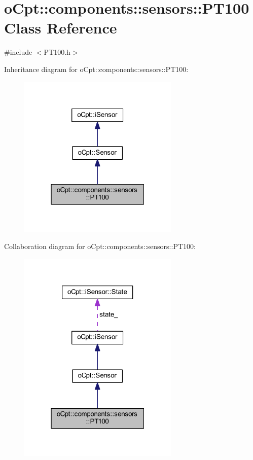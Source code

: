 \hypertarget{classo_cpt_1_1components_1_1sensors_1_1_p_t100}{}\section{o\+Cpt\+:\+:components\+:\+:sensors\+:\+:P\+T100 Class Reference}
\label{classo_cpt_1_1components_1_1sensors_1_1_p_t100}


{\ttfamily \#include $<$P\+T100.\+h$>$}



Inheritance diagram for o\+Cpt\+:\+:components\+:\+:sensors\+:\+:P\+T100\+:
\nopagebreak
\begin{figure}[H]
\begin{center}
\leavevmode
\includegraphics[width=217pt]{classo_cpt_1_1components_1_1sensors_1_1_p_t100__inherit__graph}
\end{center}
\end{figure}


Collaboration diagram for o\+Cpt\+:\+:components\+:\+:sensors\+:\+:P\+T100\+:
\nopagebreak
\begin{figure}[H]
\begin{center}
\leavevmode
\includegraphics[width=217pt]{classo_cpt_1_1components_1_1sensors_1_1_p_t100__coll__graph}
\end{center}
\end{figure}
